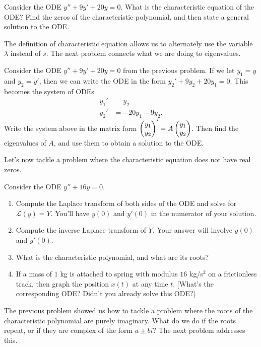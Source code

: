 \begin{problem}
 Consider the ODE $y''+9y'+20y=0$.  What is the characteristic equation of the ODE?  Find the zeros of the characteristic polynomial, and then state a general solution to the ODE.
\end{problem}

The definition of characteristic equation allows us to alternately use the variable $\lambda$ instead of $s$.  The next problem connects what we are doing to eigenvalues. 
\begin{problem}
 Consider the ODE $y''+9y'+20y=0$ from the previous problem.  If we let $y_1=y$ and $y_2=y'$, then we can write the ODE in the form $y_2'+9y_2+20y_1=0$.  This becomes the system of ODEs
\begin{align*}
 y_1'&=y_2\\
 y_2'&=-20y_1-9y_2.
\end{align*}
 Write the system above in the matrix form $\begin{pmatrix} y_1\\y_2 \end{pmatrix}' = A \begin{pmatrix} y_1\\y_2 \end{pmatrix}$.  Then find the eigenvalues of $A$, and use them to obtain a solution to the ODE. 
\end{problem}



Let's now tackle a problem where the characteristic equation does not have real zeros. 
\begin{problem}
 Consider the ODE $y''+16y=0$. 
 \begin{enumerate}
 \item Compute the Laplace transform of both sides of the ODE and solve for $\mathscr{L}(y) = Y$. You'll have $y(0)$ and $y'(0)$ in the numerator of your solution. 
 \item Compute the inverse Laplace transform of $Y$. Your answer will involve $y(0)$ and $y'(0)$. 
 \item What is the characteristic polynomial, and what are its roots?
 \item If a mass of $1$ kg is attached to spring with modulus $16$ kg/s$^2$ on a frictionless track, then graph the position $x(t)$ at any time $t$. [What's the corresponding ODE? Didn't you already solve this ODE?]
\end{enumerate} 
\end{problem}

The previous problem showed us how to tackle a problem where the roots of the characteristic polynomial are purely imaginary. What do we do if the roots repeat, or if they are complex of the form $a\pm bi$?  The next problem addresses this.  

